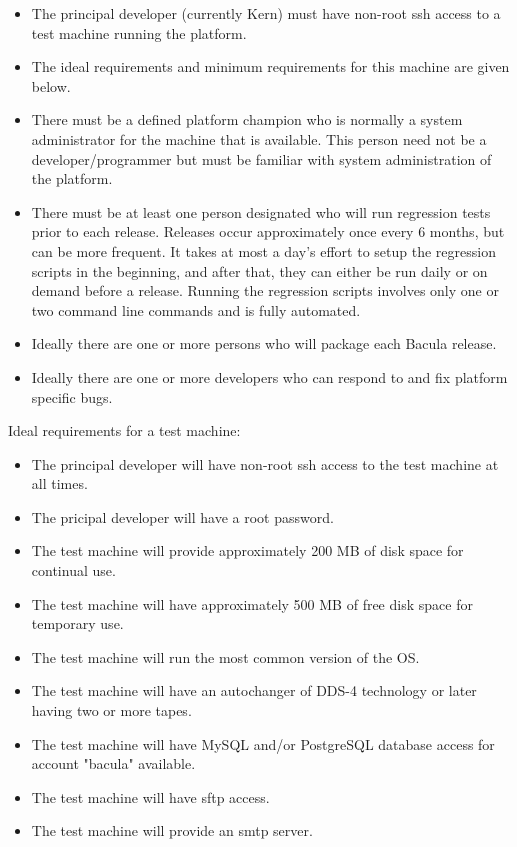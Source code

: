 \begin{itemize}
\item The principal developer (currently Kern) must have
   non-root ssh access to a test machine running the platform.
\item The ideal requirements and minimum requirements
   for this machine are given below.
\item There must be a defined platform champion who is normally
   a system administrator for the machine that is available. This
   person need not be a developer/programmer but must be familiar
   with system administration of the platform.
\item There must be at least one person designated who will 
   run regression tests prior to each release.  Releases occur
   approximately once every 6 months, but can be more frequent.
   It takes at most a day's effort to setup the regression scripts
   in the beginning, and after that, they can either be run daily
   or on demand before a release. Running the regression scripts
   involves only one or two command line commands and is fully
   automated.
\item Ideally there are one or more persons who will package
   each Bacula release.
\item Ideally there are one or more developers who can respond to
   and fix platform specific bugs.  
\end{itemize}

Ideal requirements for a test machine:
\begin{itemize}
\item The principal developer will have non-root ssh access to
  the test machine at all times.
\item The pricipal developer will have a root password.
\item The test machine will provide approximately 200 MB of
  disk space for continual use.
\item The test machine will have approximately 500 MB of free
  disk space for temporary use.
\item The test machine will run the most common version of the OS.
\item The test machine will have an autochanger of DDS-4 technology
  or later having two or more tapes.
\item The test machine will have MySQL and/or PostgreSQL database
  access for account "bacula" available.
\item The test machine will have sftp access.
\item The test machine will provide an smtp server.
\end{itemize}

